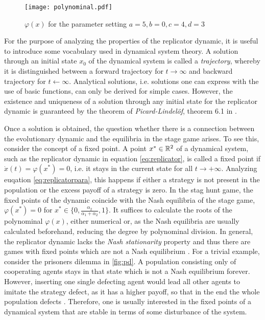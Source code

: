 \begin{figure}[h]
        \centering
        \texttt{[image: polynominal.pdf]}
        \caption[Polynominal of the Replicator Dynamic]{$\varphi(x)$ for the parameter setting $a=5, b=0, c=4, d=3$}
        \label{fig:polynominal}
\end{figure}
For the purpose of analyzing the properties of the replicator dynamic, it is 
useful to introduce some vocabulary used in dynamical system theory. 
A solution through an initial state $x_0$ of the dynamical system is called a 
\textit{trajectory}, whereby it is distinguished between a forward trajectory 
for $t \rightarrow \infty$ and backward trajectory for $t \leftarrow \infty$.
Analytical solutions, i.e. solutions one can express with the use of
basic functions, can only be derived for simple cases. 
However, the existence and uniqueness of a solution through
any initial state for the replicator dynamic is guaranteed by the theorem 
of \textit{Picard-Lindel\"of}, theorem 6.1 in 
\textcite[74]{weibull_evolutionary_1997}. 

Once a solution is obtained, the question whether there 
is a connection between the evolutionary dynamic and the equilibria in the 
stage game arises. To see this, consider the concept of a fixed point.
A point $x^* \in \mathbb{R}^2$ of a dynamical system, such as the replicator 
dynamic in equation \eqref{eq:replicator}, is called a fixed point
if $\dot{x}(t) = \varphi(x^*) = 0$, i.e. it stays in the 
current state for all $t \rightarrow + \infty $. 
Analyzing euqation \eqref{eq:replicatorpara}, 
this happens if either a strategy
is not present in the population or the excess payoff of a strategy is zero. 
In the stag hunt game, the fixed points of the
dynamic coincide with the Nash equilibria of the stage game, 
$\varphi(x^*) = 0$ for $x^* \in \{0,\frac{\alpha_2}{\alpha_1+\alpha_2},1\}$. 
It suffices to calculate the roots of the polynominal $\varphi(x)$, either
numerical or, as the Nash equilibria are usually calculated beforehand,
reducing the degree by polynominal division. In general, the replicator 
dynamic lacks the \textit{Nash stationarity} property and thus there are 
games with fixed points which are not a Nash equilibrium
\parencite{sandholm_population_2010}.
For a trivial example, consider the prisoners dilemma in \ref{fig:pd}. 
A population consisting only of cooperating agents stays in that state
which is not a Nash equilibrium forever. However, inserting one single 
defecting agent would lead all other agents to imitate the strategy defect,
as it has a higher payoff, so that in the end the whole population defects .
Therefore, one is usually interested in the fixed points of 
a dynamical system that are stable in terms of some 
disturbance of the system. 

